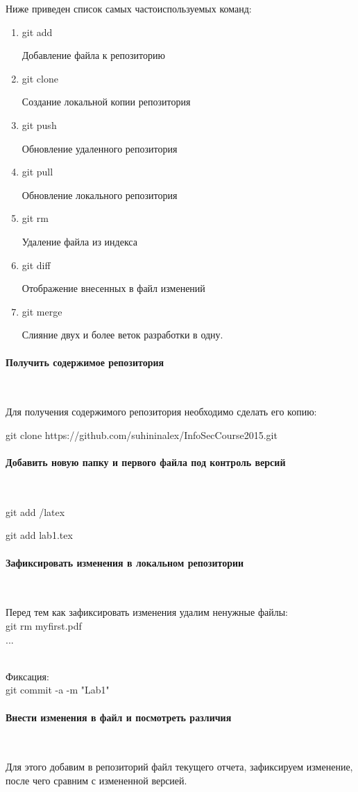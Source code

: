 \documentclass{article}
\begin{document}
Ниже приведен список самых частоиспользуемых команд:
\begin{enumerate}
\item git add

Добавление файла к репозиторию

\item git clone

Создание локальной копии репозитория

\item git push

Обновление удаленного репозитория

\item git pull

Обновление локального репозитория

\item git rm

Удаление файла из индекса

\item git diff

Отображение внесенных в файл изменений

\item git merge 

Слияние двух и более веток разработки в одну.
\end{enumerate}

\paragraph{Получить содержимое репозитория}
~

Для получения содержимого репозитория необходимо сделать его копию:

git clone https://github.com/suhininalex/InfoSecCourse2015.git

\paragraph{Добавить новую папку и первого файла под контроль версий}
~

git add /latex

git add lab1.tex

\paragraph{Зафиксировать изменения в локальном репозитории}
~

Перед тем как зафиксировать изменения удалим ненужные файлы: \\
git rm myfirst.pdf \\
...	\\
~

Фиксация: \\
git commit -a -m "Lab1" \\

\paragraph{Внести изменения в файл и посмотреть различия}
~

Для этого добавим в репозиторий файл текущего отчета, зафиксируем изменение, после чего сравним с измененной версией.
\end{document}
